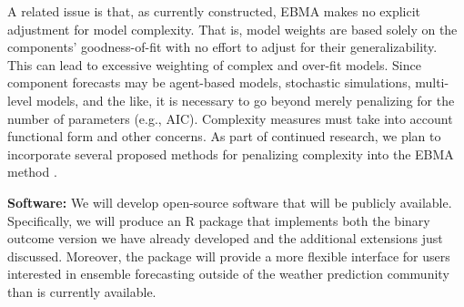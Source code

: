 \documentclass[pdftex,12pt,fullpage,oneside]{amsart}
\begin{document}
A related issue is that, as currently constructed, EBMA makes no
explicit adjustment for model complexity. That is, model weights are
based solely on the components’ goodness-of-fit with no effort to
adjust for their generalizability. This can lead to excessive
weighting of complex and over-fit models. Since component forecasts
may be agent-based models, stochastic simulations, multi-level models,
and the like, it is necessary to go beyond merely penalizing for the
number of parameters (e.g., AIC). Complexity measures must take into
account functional form and other concerns. As part of continued
research, we plan to incorporate several proposed methods for
penalizing complexity into the EBMA method \citep[c.f.,][]{Pitt:2002a,
  Pitt:2002b, Spiegelhalter:2002}.




\textbf{Software:} We will develop open-source software that will be
publicly available.  Specifically, we will produce an R package that
implements both the binary outcome version we have already developed
and the additional extensions just discussed.  Moreover, the package
will provide a more flexible interface for users interested in
ensemble forecasting outside of the weather prediction community than
is currently available.  
\end{document}
